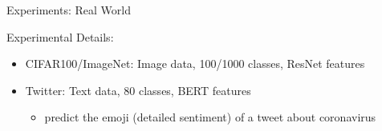 \begin{frame}{Experiments: Real World}

\resizebox{\columnwidth}{!}{

}

    \vspace{0.2in}
Experimental Details:

\begin{itemize}
    \item CIFAR100/ImageNet: Image data, 100/1000 classes, ResNet features \citep{He2016DeepRL}

    \item Twitter: Text data, 80 classes, BERT features \citep{stoikos2020multilingual}

        \begin{itemize}
            \item predict the emoji (detailed sentiment) of a tweet about coronavirus
        \end{itemize}
\end{itemize}

\end{frame}

